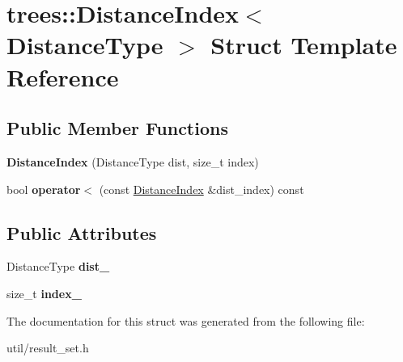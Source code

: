 \hypertarget{structtrees_1_1_distance_index}{}\section{trees\+:\+:Distance\+Index$<$ Distance\+Type $>$ Struct Template Reference}
\label{structtrees_1_1_distance_index}
\subsection*{Public Member Functions}
\begin{DoxyCompactItemize}
\item 
\mbox{\label{structtrees_1_1_distance_index_a90ce5ece57dc6f6807a3af01f8185ab3}} 
{\bfseries Distance\+Index} (Distance\+Type dist, size\+\_\+t index)
\item 
\mbox{\label{structtrees_1_1_distance_index_a244d8c16ca20d24b3d674cc597c0593a}} 
bool {\bfseries operator$<$} (const \hyperlink{structtrees_1_1_distance_index}{Distance\+Index} \&dist\+\_\+index) const
\end{DoxyCompactItemize}
\subsection*{Public Attributes}
\begin{DoxyCompactItemize}
\item 
\mbox{\label{structtrees_1_1_distance_index_a21357a72377919a1f39016632e07eefc}} 
Distance\+Type {\bfseries dist\+\_\+}
\item 
\mbox{\label{structtrees_1_1_distance_index_a8c9025202c2717d9271507e4ca4d7611}} 
size\+\_\+t {\bfseries index\+\_\+}
\end{DoxyCompactItemize}


The documentation for this struct was generated from the following file\+:\begin{DoxyCompactItemize}
\item 
util/result\+\_\+set.\+h\end{DoxyCompactItemize}
